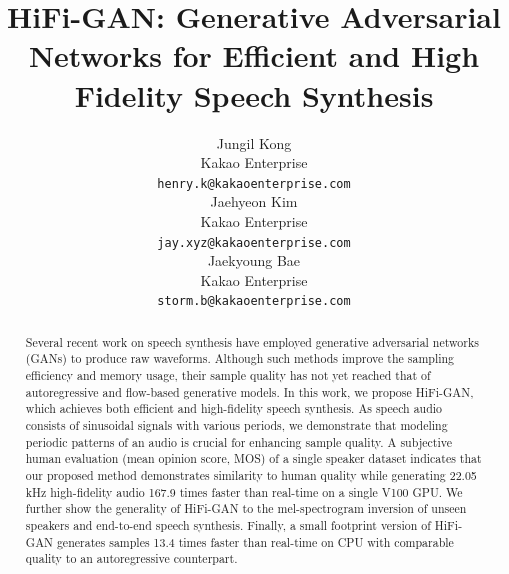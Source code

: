 \documentclass{article}
\title{HiFi-GAN: Generative Adversarial Networks for Efficient and High Fidelity Speech Synthesis}
\author{
  Jungil Kong \\
  Kakao Enterprise \\
  \texttt{henry.k@kakaoenterprise.com} \\
  \And
  Jaehyeon Kim \\
  Kakao Enterprise \\
  \texttt{jay.xyz@kakaoenterprise.com} \\
  \AND
  Jaekyoung Bae \\
  Kakao Enterprise \\
  \texttt{storm.b@kakaoenterprise.com} \\
}
\begin{document}
\maketitle

\begin{abstract}
Several recent work on speech synthesis have employed generative adversarial networks (GANs) to produce raw waveforms. Although such methods improve the sampling efficiency and memory usage, their sample quality has not yet reached that of autoregressive and flow-based generative models. In this work, we propose HiFi-GAN, which achieves both efficient and high-fidelity speech synthesis. As speech audio consists of sinusoidal signals with various periods, we demonstrate that modeling periodic patterns of an audio is crucial for enhancing sample quality. A subjective human evaluation (mean opinion score, MOS) of a single speaker dataset indicates that our proposed method demonstrates similarity to human quality while generating 22.05 kHz high-fidelity audio 167.9 times faster than real-time on a single V100 GPU. We further show the generality of HiFi-GAN to the mel-spectrogram inversion of unseen speakers and end-to-end speech synthesis. Finally, a small footprint version of HiFi-GAN generates samples 13.4 times faster than real-time on CPU with comparable quality to an autoregressive counterpart.
\end{abstract}







\newpage


\newpage

\end{document}
